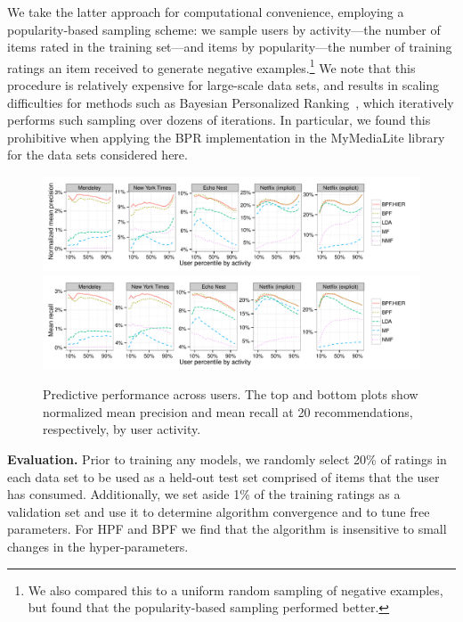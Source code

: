 We take the latter approach for computational convenience, employing a
popularity-based sampling scheme: we sample users by activity---the
number of items rated in the training set---and items by
popularity---the number of training ratings an item received to
generate negative examples.\footnote{We also compared this to a
  uniform random sampling of negative examples, but found that the
  popularity-based sampling performed better.} We note that this
procedure is relatively expensive for large-scale data sets, and
results in scaling difficulties for methods such as Bayesian
Personalized Ranking~\cite{Rendle:2009p9243,Gantner:2012p9364}, which
iteratively performs such sampling over dozens of iterations. In
particular, we found this prohibitive when applying the BPR
implementation in the MyMediaLite library for the data sets considered
here.


\begin{figure}[t!]
\centering
\includegraphics[width=\textwidth]{figures/mean_precision_at_20_by_user_percentile.pdf}\\
\includegraphics[width=\textwidth]{figures/mean_recall_at_20_by_user_percentile.pdf}\\
\caption{Predictive performance across users. The top and bottom plots
  show normalized mean precision and mean recall at 20
  recommendations, respectively, by user activity.}
\label{fig:precision_recall_by_user_activity}
\end{figure}

{\bf Evaluation.} Prior to training any models, we randomly select
20\% of ratings in each data set to be used as a held-out test set
comprised of items that the user has consumed. Additionally, we set
aside 1\% of the training ratings as a validation set and use it to
determine algorithm convergence and to tune free parameters. For HPF
and BPF we find that the algorithm is insensitive to small changes in
the hyper-parameters.

